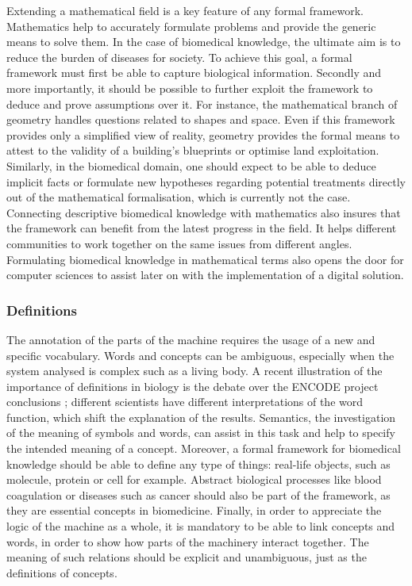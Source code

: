 Extending a mathematical field is a key feature of any formal framework. Mathematics help to accurately formulate problems and provide the generic means to solve them. In the case of biomedical knowledge, the ultimate aim is to reduce the burden of diseases for society. To achieve this goal, a formal framework must first be able to capture biological information. Secondly and more importantly, it should be possible to further exploit the framework to deduce and prove assumptions over it. For instance, the mathematical branch of geometry handles questions related to shapes and space. Even if this framework provides only a simplified view of reality, geometry provides the formal means to attest to the validity of a building’s blueprints or optimise land exploitation. Similarly, in the biomedical domain, one should expect to be able to deduce implicit facts or formulate new hypotheses regarding potential treatments directly out of the mathematical formalisation, which is currently not the case. Connecting descriptive biomedical knowledge with mathematics also insures that the framework can benefit from the latest progress in the field. It helps different communities to work together on the same issues from different angles. Formulating biomedical knowledge in mathematical terms also opens the door for computer sciences to assist later on with the implementation of a digital solution.

\subsubsection{Definitions}

The annotation of the parts of the machine requires the usage of a new and specific vocabulary. Words and concepts can be ambiguous, especially when the system analysed is complex such as a living body. A recent illustration of the importance of definitions in biology is the debate over the ENCODE project conclusions \citep{Form_and_function_2013}; different scientists have different interpretations of the word function, which shift the explanation of the results. Semantics, the investigation of the meaning of symbols and words, can assist in this task and help to specify the intended meaning of a concept. Moreover, a formal framework for biomedical knowledge should be able to define any type of things: real-life objects, such as molecule, protein or cell for example. Abstract biological processes like blood coagulation or diseases such as cancer should also be part of the framework, as they are essential concepts in biomedicine. Finally, in order to appreciate the logic of the machine as a whole, it is mandatory to be able to link concepts and words, in order to show how parts of the machinery interact together. The meaning of such relations should be explicit and unambiguous, just as the definitions of concepts.

